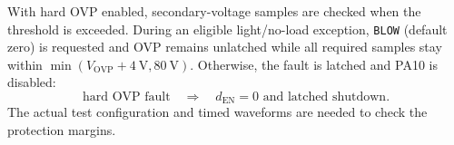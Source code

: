 With hard OVP enabled, secondary-voltage samples are checked when the threshold is exceeded. During an eligible light/no-load exception, \texttt{BLOW} (default zero) is requested and OVP remains unlatched while all required samples stay within \(\min(V_{\mathrm{OVP}}+\SI{4}{\volt},\SI{80}{\volt})\). Otherwise, the fault is latched and PA10 is disabled:
\begin{equation}
\text{hard OVP fault}\quad\Rightarrow\quad d_{\mathrm{EN}}=0\text{ and latched shutdown}.
\label{eq:app-ovp}
\end{equation}
The actual test configuration and timed waveforms are needed to check the protection margins.
